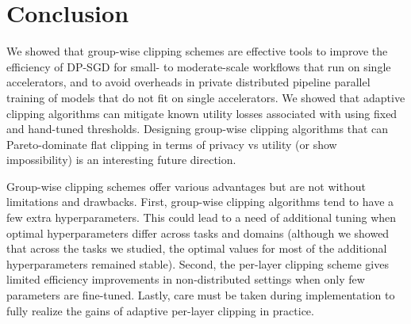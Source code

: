 \vspace{-2mm}
\section{Conclusion}
\vspace{-2mm}
We showed that group-wise clipping schemes are effective tools to improve the efficiency of DP-SGD for small- to moderate-scale workflows that run on single accelerators, and to avoid overheads in private distributed pipeline parallel training of models that do not fit on single accelerators. 
We showed that adaptive clipping algorithms can mitigate known utility losses associated with using fixed and hand-tuned thresholds. 
Designing group-wise clipping algorithms that can Pareto-dominate flat clipping in terms of privacy vs utility (or show impossibility) is an interesting future direction.

Group-wise clipping schemes offer various advantages but are not without limitations and drawbacks.
First, group-wise clipping algorithms tend to have a few extra hyperparameters. This could lead to a need of additional tuning when optimal hyperparameters differ across tasks and domains (although we showed that across the tasks we studied, the optimal values for most of the additional hyperparameters remained stable). 
Second, the per-layer clipping scheme gives limited efficiency improvements in non-distributed settings when only few parameters are fine-tuned.
Lastly, care must be taken during implementation to fully realize the gains of adaptive per-layer clipping in practice. 
